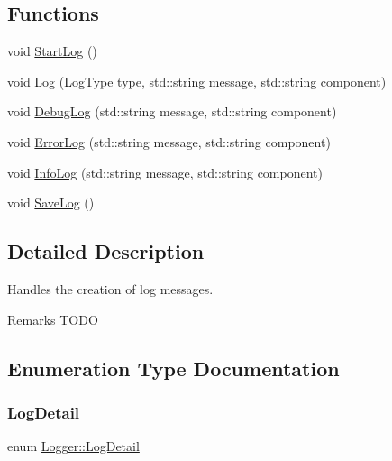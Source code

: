 \subsection*{Functions}
\begin{DoxyCompactItemize}
\item 
void \hyperlink{namespace_logger_aea870326f4476cc49457cfdcc6256022}{Start\+Log} ()
\item 
void \hyperlink{namespace_logger_a6506657f7b715f4ed4de8545c9b44e44}{Log} (\hyperlink{namespace_logger_a8f625bd9ec5f706cb67b725a98743c04}{Log\+Type} type, std\+::string message, std\+::string component)
\item 
void \hyperlink{namespace_logger_a9e0df3839eb703f75a748ab42ffe55da}{Debug\+Log} (std\+::string message, std\+::string component)
\item 
void \hyperlink{namespace_logger_a8b60f8445102c57b2f133cf523646e43}{Error\+Log} (std\+::string message, std\+::string component)
\item 
void \hyperlink{namespace_logger_ad751d2237527a66a0a7191d784a945a8}{Info\+Log} (std\+::string message, std\+::string component)
\item 
void \hyperlink{namespace_logger_a6e44b3fec519cb3bd99514d00170ef4b}{Save\+Log} ()
\end{DoxyCompactItemize}


\subsection{Detailed Description}
Handles the creation of log messages. \begin{DoxyRemark}{Remarks}
T\+O\+DO 
\end{DoxyRemark}


\subsection{Enumeration Type Documentation}
\hypertarget{namespace_logger_a5838bb966bb2e56b838cbf5ce207d014}{}\label{namespace_logger_a5838bb966bb2e56b838cbf5ce207d014} 
\subsubsection{\texorpdfstring{Log\+Detail}{LogDetail}}
{\footnotesize\ttfamily enum \hyperlink{namespace_logger_a5838bb966bb2e56b838cbf5ce207d014}{Logger\+::\+Log\+Detail}}

